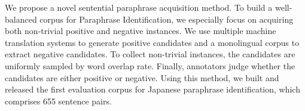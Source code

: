 We propose a novel sentential paraphrase acquisition method. To build a well-balanced corpus for Paraphrase Identification, we especially focus on acquiring both non-trivial positive and negative instances. We use multiple machine translation systems to generate positive candidates and a monolingual corpus to extract negative candidates. To collect non-trivial instances, the candidates are uniformly sampled by word overlap rate. Finally, annotators judge whether the candidates are either positive or negative. Using this method, we built and released the first evaluation corpus for Japanese paraphrase identification, which comprises 655 sentence pairs.
